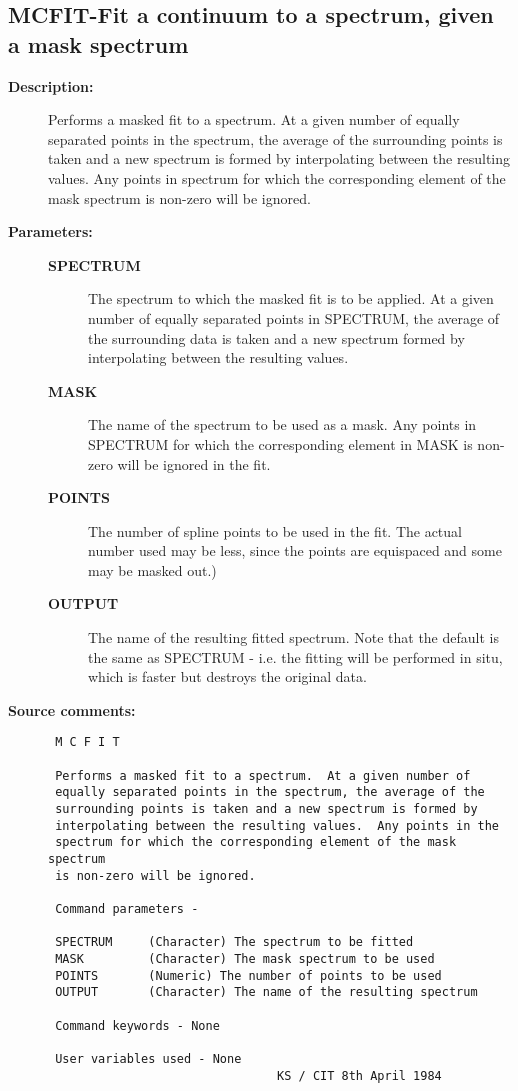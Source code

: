\subsection{MCFIT-\label{MCFIT}Fit a continuum to a spectrum, given a mask spectrum}
\begin{description}

\item [{\bf Description:}]
 Performs a masked fit to a spectrum.  At a given number of
 equally separated points in the spectrum, the average of the
 surrounding points is taken and a new spectrum is formed by
 interpolating between the resulting values.  Any points in
 spectrum for which the corresponding element of the mask
 spectrum is non-zero will be ignored.

\item [{\bf Parameters:}]
\begin{description}
\item [{\bf SPECTRUM}]
 The spectrum to which the masked fit is
 to be applied.  At a given number of equally separated
 points in SPECTRUM, the average of the surrounding
 data is taken and a new spectrum formed by interpolating
 between the resulting values.
\item [{\bf MASK}]
 The name of the spectrum to be used as a mask.  Any
 points in SPECTRUM for which the corresponding element in
 MASK is non-zero will be ignored in the fit.
\item [{\bf POINTS}]
 The number of spline points to be used in the fit.
 The actual number used may be less, since the points are
 equispaced and some may be masked out.)
\item [{\bf OUTPUT}]
 The name of the resulting fitted spectrum.  Note
 that the default is the same as SPECTRUM - i.e. the fitting
 will be performed in situ, which is faster but destroys the
 original data.
\end{description}

\item [{\bf Source comments:}]
\begin{verbatim}
 M C F I T

 Performs a masked fit to a spectrum.  At a given number of
 equally separated points in the spectrum, the average of the
 surrounding points is taken and a new spectrum is formed by
 interpolating between the resulting values.  Any points in the
 spectrum for which the corresponding element of the mask spectrum
 is non-zero will be ignored.

 Command parameters -

 SPECTRUM     (Character) The spectrum to be fitted
 MASK         (Character) The mask spectrum to be used
 POINTS       (Numeric) The number of points to be used
 OUTPUT       (Character) The name of the resulting spectrum

 Command keywords - None

 User variables used - None
                                KS / CIT 8th April 1984
\end{verbatim}
\end{description}
